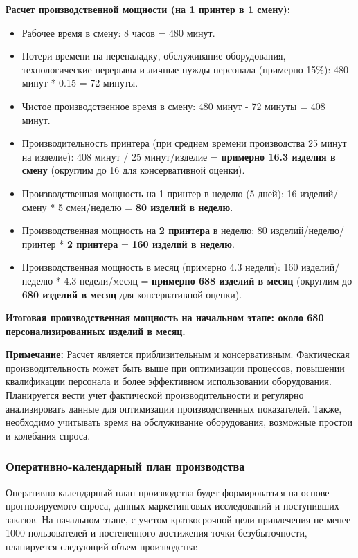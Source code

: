 \vspace{0.3cm}

\textbf{Расчет производственной мощности (на 1 принтер в 1 смену):}

\begin{itemize}[noitemsep]
\item Рабочее время в смену: 8 часов = 480 минут.
\item Потери времени на переналадку, обслуживание оборудования, технологические перерывы и личные нужды персонала (примерно 15\%): 480 минут * 0.15 = 72 минуты.
\item Чистое производственное время в смену: 480 минут - 72 минуты = 408 минут.
\item Производительность принтера (при среднем времени производства 25 минут на изделие): 408 минут / 25 минут/изделие = \textbf{примерно 16.3 изделия в смену} (округлим до 16 для консервативной оценки).
\item Производственная мощность на 1 принтер в неделю (5 дней): 16 изделий/смену * 5 смен/неделю = \textbf{80 изделий в неделю}.
\item Производственная мощность на \textbf{2 принтера} в неделю: 80 изделий/неделю/принтер * \textbf{2 принтера} = \textbf{160 изделий в неделю}.
\item Производственная мощность в месяц (примерно 4.3 недели): 160 изделий/неделю * 4.3 недели/месяц = \textbf{примерно 688 изделий в месяц} (округлим до \textbf{680 изделий в месяц} для консервативной оценки).
\end{itemize}

\textbf{Итоговая производственная мощность на начальном этапе: около 680 персонализированных изделий в месяц.}

\textbf{Примечание:}  Расчет является приблизительным и консервативным. Фактическая производительность может быть выше при оптимизации процессов, повышении квалификации персонала и более эффективном использовании оборудования.  Планируется вести учет фактической производительности и регулярно анализировать данные для оптимизации производственных показателей.  Также, необходимо учитывать время на обслуживание оборудования, возможные простои и колебания спроса.

\subsubsection{Оперативно-календарный план производства}

Оперативно-календарный план производства будет формироваться на основе прогнозируемого спроса, данных маркетинговых исследований и поступивших заказов.  На начальном этапе, с учетом краткосрочной цели привлечения не менее 1000 пользователей и постепенного достижения точки безубыточности, планируется следующий объем производства:

